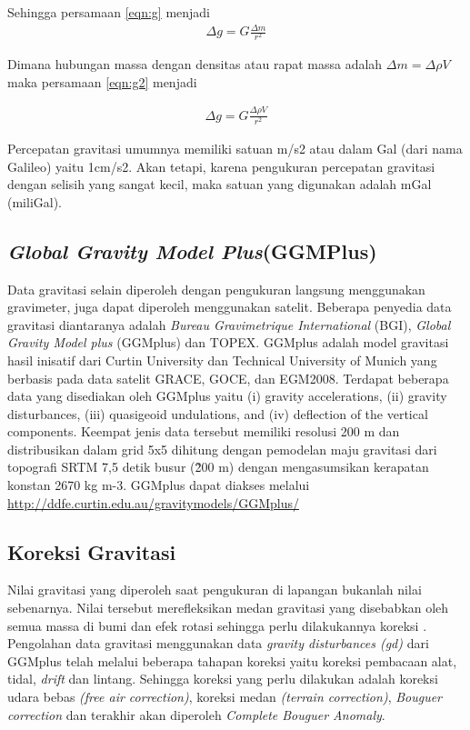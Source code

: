 Sehingga persamaan \ref{eqn:g} menjadi
\begin{align}
	\Delta g = G \frac{\Delta m}{r^{2}} \label{eqn:g2}
\end{align}

Dimana hubungan massa dengan densitas atau rapat massa adalah $\Delta m = \Delta \rho V $ maka persamaan \ref{eqn:g2} menjadi

\begin{align}
	\Delta g = G \frac{\Delta \rho V}{r^{2}} \label{eqn:g3}
\end{align}

\hspace{25pt}Percepatan gravitasi umumnya memiliki satuan m/s2 atau dalam Gal (dari nama Galileo) yaitu 1cm/s2. Akan tetapi, karena pengukuran percepatan gravitasi dengan selisih yang sangat kecil, maka satuan yang digunakan adalah mGal (miliGal).

\subsection{\textit{Global Gravity Model Plus}(GGMPlus)}
\hspace{25pt} Data gravitasi selain diperoleh dengan pengukuran langsung menggunakan gravimeter, juga dapat diperoleh menggunakan satelit. 	Beberapa penyedia data gravitasi diantaranya adalah \textit{Bureau Gravimetrique International }(BGI), \textit{Global Gravity Model plus }(GGMplus) dan TOPEX. GGMplus adalah model gravitasi hasil inisatif dari Curtin University dan Technical University of Munich yang berbasis pada data satelit GRACE, GOCE, dan EGM2008. Terdapat beberapa data yang disediakan oleh GGMplus yaitu (i) gravity accelerations, (ii) gravity disturbances, (iii) quasigeoid undulations, and (iv) deflection of the vertical components. Keempat jenis data tersebut memiliki resolusi 200 m dan distribusikan dalam grid 5x5 dihitung dengan pemodelan maju gravitasi dari topografi SRTM 7,5 detik busur (\~200 m) dengan mengasumsikan kerapatan konstan 2670 kg m-3.  GGMplus dapat diakses melalui  \href{http://ddfe.curtin.edu.au/gravitymodels/GGMplus/}{http://ddfe.curtin.edu.au/gravitymodels/GGMplus/}\citep{Hirt}
\subsection{Koreksi Gravitasi}
\hspace{25pt} Nilai gravitasi yang diperoleh saat pengukuran di lapangan bukanlah nilai sebenarnya. Nilai tersebut merefleksikan medan gravitasi yang disebabkan oleh semua massa di bumi dan efek rotasi sehingga perlu dilakukannya koreksi \citep{Mariita}. Pengolahan data gravitasi menggunakan data \textit{gravity disturbances (gd)} dari GGMplus telah melalui beberapa tahapan koreksi yaitu koreksi pembacaan alat, tidal, \textit{drift} dan lintang. Sehingga koreksi yang perlu dilakukan adalah koreksi udara bebas \textit{(free air correction)}, koreksi medan \textit{(terrain correction)}, \textit{Bouguer correction} dan terakhir akan diperoleh \textit{Complete Bouguer Anomaly}.

